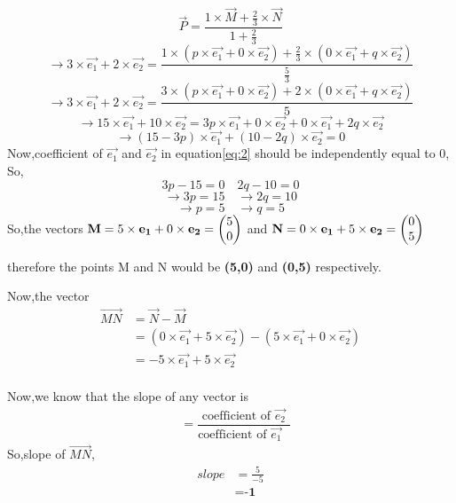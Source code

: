\documentclass[journal,12pt,twocolumn]{IEEEtran}
\begin{document}
\begin{equation*}
    \vec{P}=\frac{1\times \vec{M}+\frac{2}{3}\times \vec{N}}{1+\frac{2}{3}}
\end{equation*}
\begin{equation*}
    \rightarrow3\times\vec{e_1}+2\times\vec{e_2}=\frac{1\times (p\times \vec{e_1}+0\times\vec{e_2})+\frac{2}{3}\times (0\times\vec{e_1}+q\times\vec{e_2})}{\frac{5}{3}}
\end{equation*}
\begin{equation*}
\rightarrow3\times\vec{e_1}+2\times\vec{e_2}=\frac{3\times (p\times\vec{e_1}+0\times\vec{e_2})+2\times (0\times\vec{e_1}+q\times\vec{e_2})}{5}
\end{equation*}
\begin{equation*}
    \rightarrow 15\times\vec{e_1}+10\times\vec{e_2}=3p\times\vec{e_1}+0\times\vec{e_2}+0\times\vec{e_1}+2q\times\vec{e_2}
\end{equation*}
\begin{equation}
\label{eq:2}
\rightarrow (15-3p)\times \vec{e_1}+(10-2q)\times\vec{e_2}=0
\end{equation}
Now,coefficient of $\vec{e_1}$ and $\vec{e_2}$ in equation\eqref{eq:2} should be independently equal to 0,
So,
\begin{equation*}
3p-15=0\quad 2q-10=0
\end{equation*}
\begin{equation*}
\rightarrow3p=15\quad \rightarrow2q=10
\end{equation*}
\begin{equation}
\rightarrow p=5\quad \rightarrow q=5      
\end{equation}
So,the vectors $\mathbf{M}=5\times\mathbf{e_1}+0\times\mathbf{e_2}=\begin{pmatrix}5\\0\end{pmatrix}$ and $ \mathbf{N}=0\times\mathbf{e_1}+5\times\mathbf{e_2}=\begin{pmatrix}0\\5\end{pmatrix}$ 

therefore the points M and N would be \textbf{(5,0)} and \textbf{(0,5)} respectively.

Now,the vector
\begin{align}
\vec{MN}&=\vec{N}-\vec{M}\\
&=(0\times\vec{e_1}+5\times\vec{e_2})-(5\times\vec{e_1}+0\times\vec{e_2})\\
&=-5\times\vec{e_1}+5\times\vec{e_2}\\
\end{align}

Now,we know that the slope of any vector is
\begin{align}
    &= \dfrac{\text{coefficient of $\vec{e_2}$}}{\text{coefficient of $\vec{e_1}$ }}
\end{align}
So,slope of $\vec{MN}$,
 \begin{align}
  slope &=\frac{5}{-5}\\
  &=\textbf{-1}             
\end{align}
\end{document}
